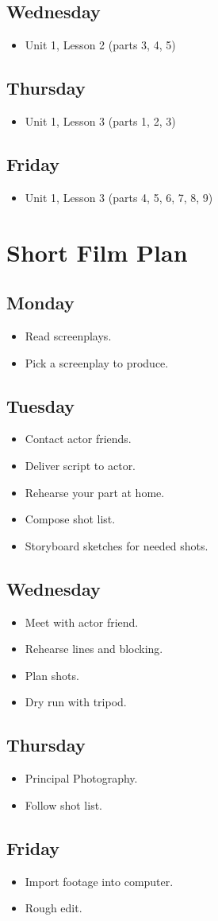 \documentclass[12pt]{article}
\newcommand{\M}{Monday}
\newcommand{\Tu}{Tuesday}
\newcommand{\W}{Wednesday}
\newcommand{\Th}{Thursday}
\newcommand{\F}{Friday}
\newenvironment{planDay}[1]{\subsection{#1}\begin{itemize} \large }{\end{itemize}}
\begin{document}
\begin{planDay}{\W}
\item Unit 1, Lesson 2 (parts 3, 4, 5)
\end{planDay}

\begin{planDay}{\Th}
\item Unit 1, Lesson 3 (parts 1, 2, 3)
\end{planDay}

\begin{planDay}{\F}
\item Unit 1, Lesson 3 (parts 4, 5, 6, 7, 8, 9)
\end{planDay}



\newpage

\section{Short Film Plan}

\begin{planDay}{\M}
\item Read screenplays.
\item Pick a screenplay to produce.
\end{planDay}

\begin{planDay}{\Tu}
\item Contact actor friends.
\item Deliver script to actor.
\item Rehearse your part at home.
\item Compose shot list.
\item Storyboard sketches for needed shots.
\end{planDay}

\begin{planDay}{\W}
\item Meet with actor friend.
\item Rehearse lines and blocking.
\item Plan shots.
\item Dry run with tripod.
\end{planDay}

\begin{planDay}{\Th}
\item Principal Photography.
\item Follow shot list.
\end{planDay}

\begin{planDay}{\F}
\item Import footage into computer.
\item Rough edit.
\end{planDay}
\end{document}
